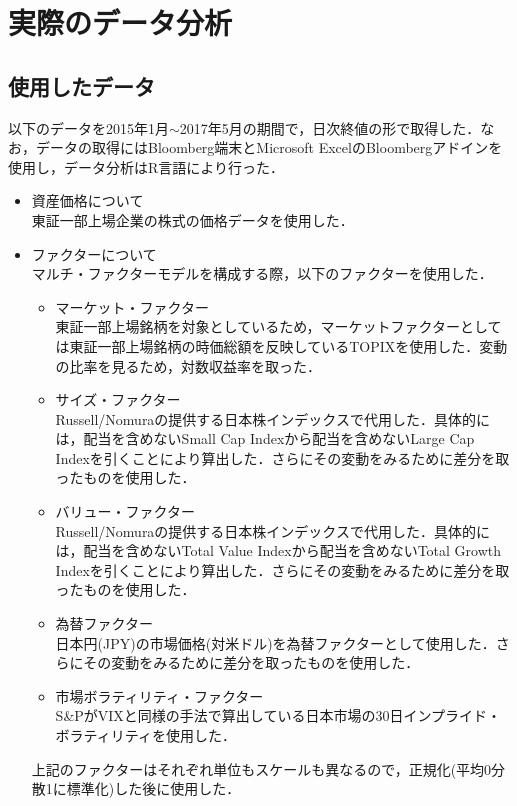 \documentclass[11pt]{jreport}
\begin{document}
\chapter{実際のデータ分析}
\section{使用したデータ}
以下のデータを2015年1月$\sim$2017年5月の期間で，日次終値の形で取得した．なお，データの取得にはBloomberg端末とMicrosoft ExcelのBloombergアドインを使用し，データ分析はR言語により行った．
\begin{itemize}
\item 資産価格について\\
東証一部上場企業の株式の価格データを使用した．
\item ファクターについて\\
マルチ・ファクターモデルを構成する際，以下のファクターを使用した．
\begin{itemize}
\item マーケット・ファクター\\
東証一部上場銘柄を対象としているため，マーケットファクターとしては東証一部上場銘柄の時価総額を反映しているTOPIXを使用した．変動の比率を見るため，対数収益率を取った．
\item サイズ・ファクター\\
Russell/Nomuraの提供する日本株インデックスで代用した．具体的には，配当を含めないSmall Cap Indexから配当を含めないLarge Cap Indexを引くことにより算出した．さらにその変動をみるために差分を取ったものを使用した．
\item バリュー・ファクター\\
Russell/Nomuraの提供する日本株インデックスで代用した．具体的には，配当を含めないTotal Value Indexから配当を含めないTotal Growth Indexを引くことにより算出した．さらにその変動をみるために差分を取ったものを使用した．
\item 為替ファクター\\
日本円(JPY)の市場価格(対米ドル)を為替ファクターとして使用した．さらにその変動をみるために差分を取ったものを使用した．
\item 市場ボラティリティ・ファクター\\
S\&PがVIXと同様の手法で算出している日本市場の30日インプライド・ボラティリティを使用した．
\end{itemize}
上記のファクターはそれぞれ単位もスケールも異なるので，正規化(平均0分散1に標準化)した後に使用した．
\end{itemize}
\end{document}
